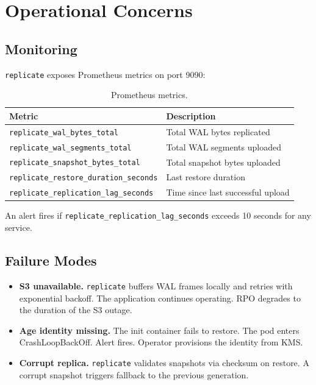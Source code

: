 \section{Operational Concerns}


\subsection{Monitoring}

\texttt{replicate} exposes Prometheus metrics on port 9090:

\begin{table}[H]
\centering
\begin{tabular}{@{}ll@{}}
\toprule
\textbf{Metric} & \textbf{Description} \\
\midrule
\texttt{replicate\_wal\_bytes\_total}      & Total WAL bytes replicated \\
\texttt{replicate\_wal\_segments\_total}   & Total WAL segments uploaded \\
\texttt{replicate\_snapshot\_bytes\_total} & Total snapshot bytes uploaded \\
\texttt{replicate\_restore\_duration\_seconds} & Last restore duration \\
\texttt{replicate\_replication\_lag\_seconds}  & Time since last successful upload \\
\bottomrule
\end{tabular}
\caption{Prometheus metrics.}
\label{tab:metrics}
\end{table}

An alert fires if \texttt{replicate\_replication\_lag\_seconds} exceeds 10
seconds for any service.

\subsection{Failure Modes}

\begin{itemize}[nosep]
    \item \textbf{S3 unavailable.} \texttt{replicate} buffers WAL frames
    locally and retries with exponential backoff. The application continues
    operating. RPO degrades to the duration of the S3 outage.

    \item \textbf{Age identity missing.} The init container fails to restore.
    The pod enters CrashLoopBackOff. Alert fires. Operator provisions the
    identity from KMS.

    \item \textbf{Corrupt replica.} \texttt{replicate} validates snapshots
    via checksum on restore. A corrupt snapshot triggers fallback to the
    previous generation.
\end{itemize}

